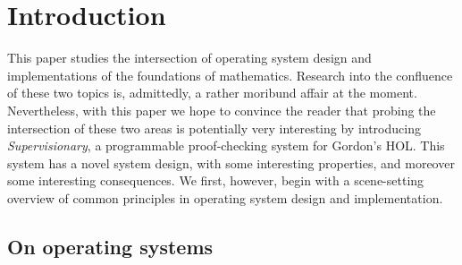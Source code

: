 \documentclass[a4paper, UKenglish, cleveref, autoref, thm-restate, colorlinks]{lipics-v2021}
\begin{document}
\section{Introduction}
\label{sect.introduction}

This paper studies the intersection of operating system design and implementations of the foundations of mathematics.
Research into the confluence of these two topics is, admittedly, a rather moribund affair at the moment.
Nevertheless, with this paper we hope to convince the reader that probing the intersection of these two areas is potentially very interesting by introducing \emph{Supervisionary}, a programmable proof-checking system for Gordon's HOL.
This system has a novel system design, with some interesting properties, and moreover some interesting consequences.
We first, however, begin with a scene-setting overview of common principles in operating system design and implementation.

\subsection{On operating systems}
\end{document}
